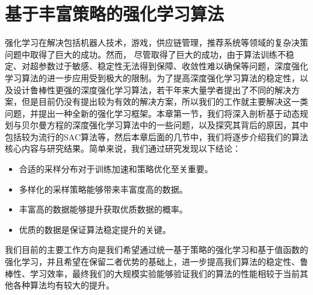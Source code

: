 \chapter{基于丰富策略的强化学习算法}
\label{Chpt: diverisity pi}


强化学习在解决包括机器人技术，游戏，供应链管理，推荐系统等领域的复杂决策问题中取得了巨大的成功。然而， 尽管取得了巨大的成功，由于算法训练不稳定、对超参数过于敏感、稳定性无法得到保障、收敛性难以确保等问题，深度强化学习算法的进一步应用受到极大的限制。为了提高深度强化学习算法的稳定性，以及设计鲁棒性更强的深度强化学习算法，若干年来大量学者提出了不同的解决方案，但是目前仍没有提出较为有效的解决方案，所以我们的工作就主要解决这一类问题，并提出一种全新的强化学习框架。本章第一节，我们将深入剖析基于动态规划与贝尔曼方程的深度强化学习算法中的一些问题，以及探究其背后的原因，其中包括较为流行的SAC算法等，然后本章后面的几节中，我们将逐步介绍我们的算法核心内容与研究结果。简单来说，我们通过研究发现以下结论：
\begin{itemize}
    \item 合适的采样分布对于训练加速和策略优化至关重要。
    \item 多样化的采样策略能够带来丰富度高的数据。
    \item 丰富高的数据能够提升获取优质数据的概率。
    \item 优质的数据是保证算法稳定提升的关键。
\end{itemize}
我们目前的主要工作方向是我们希望通过统一基于策略的强化学习和基于值函数的强化学习，并且希望在保留二者优势的基础上，进一步提高我们算法的稳定性、鲁棒性、学习效率，最终我们的大规模实验能够验证我们的算法的性能相较于当前其他各种算法均有较大的提升。

